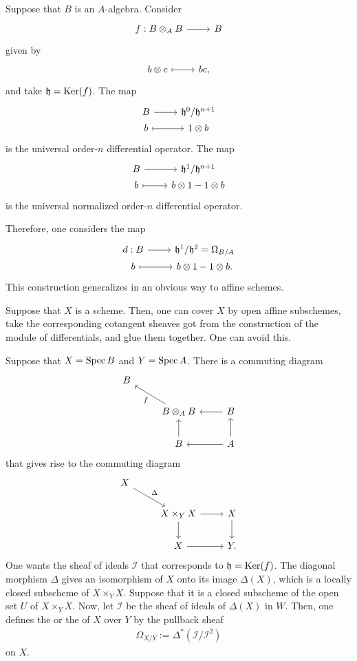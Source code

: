 \documentclass [11 pt, oneside] {article}
\begin{document}
Suppose that $B$ is an $A$-algebra. Consider
\[
\begin{tikzcd}
	f:B\tensor_A B\ar[r] &B
\end{tikzcd}
\]
given by 
\[
\begin{tikzcd}
	b\tensor c \ar[r,mapsto] & bc,
\end{tikzcd}
\]
and take $\mathfrak{h} = \operatorname{Ker} (f)$. The map
\[
\begin{tikzcd}[row sep = 0 em]
	B\ar[r]& \mathfrak{h}^0/\mathfrak{h}^{n+1}\\
	b\ar[r,mapsto] & 1\tensor b
\end{tikzcd}
\]
is the universal order-$n$ differential operator. The map
\[
\begin{tikzcd}[row sep = 0 em]
	B\ar[r] & \mathfrak{h}^1/\mathfrak{h}^{n+1}\\
	b\ar[r,mapsto] & b\tensor 1-1\tensor b
\end{tikzcd}
\]
is the universal normalized order-$n$ differential operator.

Therefore, one considers the map
\[
\begin{tikzcd}[row sep = 0 em]
	d: B\ar[r]& \mathfrak{h}^1/\mathfrak{h}^2 = \Omega_{B/A}\\
	b\ar[r, mapsto] & b\tensor 1-1\tensor b.
\end{tikzcd}
\]
This construction generalizes in an obvious way to affine schemes.

Suppose that $X$ is a scheme. Then, one can cover $X$ by open affine subschemes, take the corresponding cotangent sheaves got from the construction of the module of differentials, and glue them together. One can avoid this.

Suppose that $X=\operatorname{Spec} B$ and $Y=\operatorname{Spec} A$. There is a commuting diagram
\[
\begin{tikzcd}
	B\\
	& B\tensor_A B\ar[ul,"f"]& \ar[l]B\\
	& B\ar[u] & A\ar[l]\ar[u]
\end{tikzcd}
\]
that gives rise to the commuting diagram
\[
\begin{tikzcd}
	X\ar[dr, "\Delta"] \\
	& X\times_Y X \ar[r]\ar[d] & X\ar[d]\\
	& X \ar[r] & Y.
\end{tikzcd}
\]
One wants the sheaf of ideals $\mathscr{I}$ that corresponds to $\mathfrak{h}= \operatorname{Ker}(f)$. 
The diagonal morphism $\Delta$ gives an isomorphism of $X$ onto its image $\Delta(X)$, which is a locally closed subscheme of $X\times_Y X$. Suppose that it is a closed subscheme of the open set $U$ of $X\times_YX$. 
Now, let $\mathscr{I}$ be the sheaf of ideals of $\Delta(X)$ in $W$. Then, one defines the  or the  of $X$ over $Y$ by the pullback sheaf
\begin{align*}
	\Omega_{X/Y} := \Delta^*(\mathscr{I}/\mathscr{I}^2)
\end{align*}
on $X$.
\end{document}
